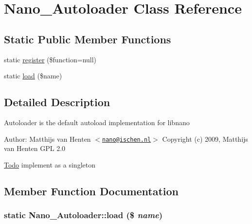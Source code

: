 \hypertarget{classNano__Autoloader}{
\section{Nano\_\-Autoloader Class Reference}
\label{classNano__Autoloader}
}
\subsection*{Static Public Member Functions}
\begin{CompactItemize}
\item 
static \hyperlink{classNano__Autoloader_0406e0b6151b72f03e5b215e2cc63c6a}{register} (\$function=null)
\item 
static \hyperlink{classNano__Autoloader_cee2f22b91ab97fde238884d1cd537a1}{load} (\$name)
\end{CompactItemize}


\subsection{Detailed Description}
Autoloader is the default autoload implementation for libnano \begin{Desc}
\item[Author:]Matthijs van Henten $<$\href{mailto:nano@ischen.nl}{\tt nano@ischen.nl}$>$  Copyright (c) 2009, Matthijs van Henten  GPL 2.0 \end{Desc}
\begin{Desc}
\item[\hyperlink{todo__todo000001}{Todo}]implement as a singleton \end{Desc}


\subsection{Member Function Documentation}
\hypertarget{classNano__Autoloader_cee2f22b91ab97fde238884d1cd537a1}{
\subsubsection[{load}]{\setlength{\rightskip}{0pt plus 5cm}static Nano\_\-Autoloader::load (\$ {\em name})}}
\label{classNano__Autoloader_cee2f22b91ab97fde238884d1cd537a1}



